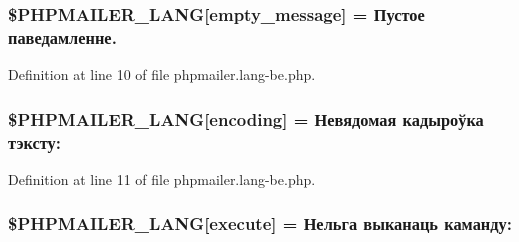 \subsubsection[{\texorpdfstring{\$\+P\+H\+P\+M\+A\+I\+L\+E\+R\+\_\+\+L\+A\+NG}{$PHPMAILER_LANG}}]{\setlength{\rightskip}{0pt plus 5cm}\$P\+H\+P\+M\+A\+I\+L\+E\+R\+\_\+\+L\+A\+NG\mbox{[}\textquotesingle{}empty\+\_\+message\textquotesingle{}\mbox{]} = \textquotesingle{}Пустое паведамленне.\textquotesingle{}}\hypertarget{phpmailer_8lang-be_8php_a33772099f637c9d6c2cd7425e0e37fed}{}\label{phpmailer_8lang-be_8php_a33772099f637c9d6c2cd7425e0e37fed}


Definition at line 10 of file phpmailer.\+lang-\/be.\+php.

\subsubsection[{\texorpdfstring{\$\+P\+H\+P\+M\+A\+I\+L\+E\+R\+\_\+\+L\+A\+NG}{$PHPMAILER_LANG}}]{\setlength{\rightskip}{0pt plus 5cm}\$P\+H\+P\+M\+A\+I\+L\+E\+R\+\_\+\+L\+A\+NG\mbox{[}\textquotesingle{}encoding\textquotesingle{}\mbox{]} = \textquotesingle{}Невядомая кадыроўка тэксту\+: \textquotesingle{}}\hypertarget{phpmailer_8lang-be_8php_a817f7283f3d54c970a0c10305cc668cc}{}\label{phpmailer_8lang-be_8php_a817f7283f3d54c970a0c10305cc668cc}


Definition at line 11 of file phpmailer.\+lang-\/be.\+php.

\subsubsection[{\texorpdfstring{\$\+P\+H\+P\+M\+A\+I\+L\+E\+R\+\_\+\+L\+A\+NG}{$PHPMAILER_LANG}}]{\setlength{\rightskip}{0pt plus 5cm}\$P\+H\+P\+M\+A\+I\+L\+E\+R\+\_\+\+L\+A\+NG\mbox{[}\textquotesingle{}execute\textquotesingle{}\mbox{]} = \textquotesingle{}Нельга выканаць каманду\+: \textquotesingle{}}\hypertarget{phpmailer_8lang-be_8php_a668217a9563a168f30f2a8548b6ed5a9}{}\label{phpmailer_8lang-be_8php_a668217a9563a168f30f2a8548b6ed5a9}


